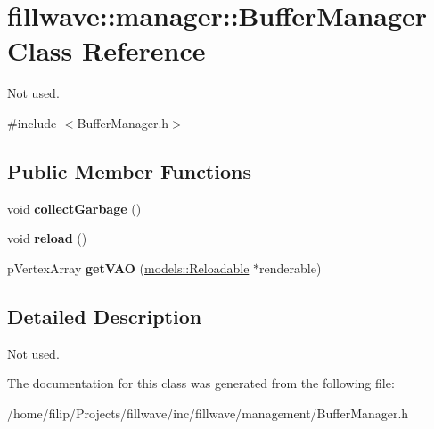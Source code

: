 \hypertarget{classfillwave_1_1manager_1_1BufferManager}{}\section{fillwave\+:\+:manager\+:\+:Buffer\+Manager Class Reference}
\label{classfillwave_1_1manager_1_1BufferManager}


Not used.  




{\ttfamily \#include $<$Buffer\+Manager.\+h$>$}

\subsection*{Public Member Functions}
\begin{DoxyCompactItemize}
\item 
\hypertarget{classfillwave_1_1manager_1_1BufferManager_a8be66b70766ca69dd3e28d658a71dc9e}{}void {\bfseries collect\+Garbage} ()\label{classfillwave_1_1manager_1_1BufferManager_a8be66b70766ca69dd3e28d658a71dc9e}

\item 
\hypertarget{classfillwave_1_1manager_1_1BufferManager_ab47918353827a659c6edb89a5ab0ba28}{}void {\bfseries reload} ()\label{classfillwave_1_1manager_1_1BufferManager_ab47918353827a659c6edb89a5ab0ba28}

\item 
\hypertarget{classfillwave_1_1manager_1_1BufferManager_a6f43be3ce2b753eb9f4b52e2947745dd}{}p\+Vertex\+Array {\bfseries get\+V\+A\+O} (\hyperlink{classfillwave_1_1models_1_1Reloadable}{models\+::\+Reloadable} $\ast$renderable)\label{classfillwave_1_1manager_1_1BufferManager_a6f43be3ce2b753eb9f4b52e2947745dd}

\end{DoxyCompactItemize}


\subsection{Detailed Description}
Not used. 

The documentation for this class was generated from the following file\+:\begin{DoxyCompactItemize}
\item 
/home/filip/\+Projects/fillwave/inc/fillwave/management/Buffer\+Manager.\+h\end{DoxyCompactItemize}
